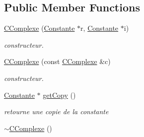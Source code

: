 \subsection*{Public Member Functions}
\begin{DoxyCompactItemize}
\item 
\hyperlink{class_c_complexe_afd567f5a10d7fcf6128124b220718973}{C\-Complexe} (\hyperlink{class_constante}{Constante} $\ast$r, \hyperlink{class_constante}{Constante} $\ast$i)
\begin{DoxyCompactList}\small\item\em constructeur. \end{DoxyCompactList}\item 
\hyperlink{class_c_complexe_a20f9638e3ba3600744ec387fa70cc30b}{C\-Complexe} (const \hyperlink{class_c_complexe}{C\-Complexe} \&c)
\begin{DoxyCompactList}\small\item\em constructeur. \end{DoxyCompactList}\item 
\hyperlink{class_constante}{Constante} $\ast$ \hyperlink{class_c_complexe_a5afb89b25938e8c6b457de3b80da5cb0}{get\-Copy} ()
\begin{DoxyCompactList}\small\item\em retourne une copie de la constante \end{DoxyCompactList}\item 
\hypertarget{class_c_complexe_a6dfa179b48b5bb2ba5eb55fec7e971b8}{\hyperlink{class_c_complexe_a6dfa179b48b5bb2ba5eb55fec7e971b8}{$\sim$\-C\-Complexe} ()}\label{class_c_complexe_a6dfa179b48b5bb2ba5eb55fec7e971b8}


\end{DoxyCompactItemize}
